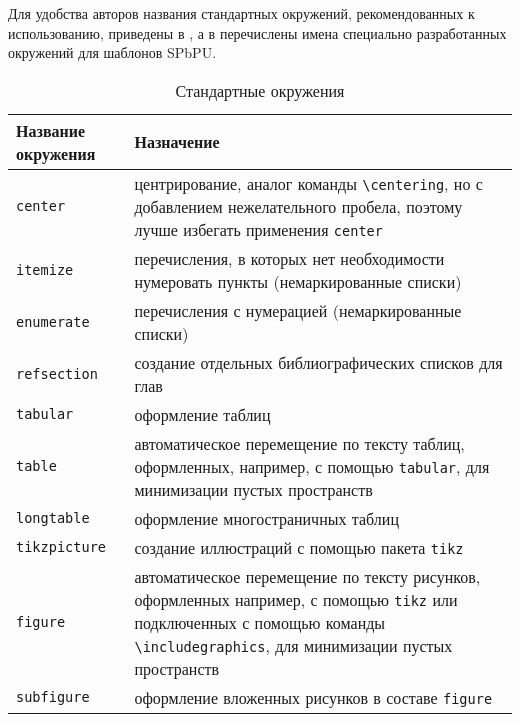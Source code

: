Для удобства авторов названия стандартных окружений, рекомендованных к использованию, приведены в , а в   перечислены имена специально разработанных окружений для шаблонов SPbPU.





	\begin{table} [htbp]%
	\centering\small
	\caption{Стандартные окружения}%
	\label{tab:enum-std}
	 \begin{Spacing}{\Single} %
	  \renewcommand*{\arraystretch}{1.5} %
		\begin{tabular}{|l|p{11cm}|}
			\hline
			Название окружения&Назначение\\
			\hline
			\verb|center| &	центрирование, аналог команды \verb|\centering|, но с добавлением нежелательного пробела, поэтому лучше избегать применения \verb|center|\\ \hline
			\verb|itemize| &{перечисления, в которых нет необходимости нумеровать  пункты (немаркированные списки)} \\ \hline
			\verb|enumerate| & перечисления с нумерацией (немаркированные списки) \\ \hline
			\verb|refsection| & создание отдельных библиографических списков для глав \\ \hline
			\verb|tabular| & оформление таблиц \\ \hline
			\verb|table|   &{автоматическое перемещение по тексту таблиц, оформленных, например, с помощью \verb|tabular|, для минимизации пустых пространств} \\ \hline
			\verb|longtable| & оформление многостраничных таблиц \\ \hline
			\verb|tikzpicture| & создание иллюстраций с помощью пакета \verb|tikz| \cite{ctan-tikz} \\ \hline
			\verb|figure| &{автоматическое перемещение по тексту рисунков, оформленных например, с помощью \verb|tikz| или подключенных с помощью команды \verb|\includegraphics|, для минимизации пустых пространств} \\ \hline
			\verb|subfigure| & оформление вложенных рисунков в составе \verb|figure| \\ \hline

\end{tabular}
\end{Spacing}
\end{table}
